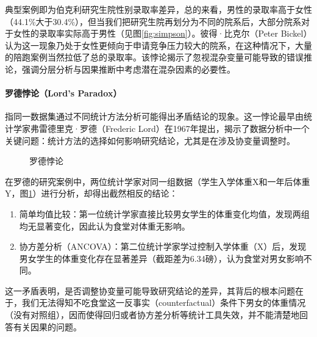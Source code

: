典型案例即为伯克利研究生院性别录取率差异，总的来看，男性的录取率高于女性（44.1\%大于30.4\%），但当我们把研究生院再划分为不同的院系后，大部分院系对于女性的录取率实际高于男性（见图\ref{fig:simpson}）。彼得·比克尔（Peter Bickel）认为这一现象乃处于女性更倾向于申请竞争压力较大的院系，在这种情况下，大量的陪跑案例当然拉低了总的录取率。该悖论揭示了忽视混杂变量可能导致的错误推论，强调分层分析与因果推断中考虑潜在混杂因素的必要性。

\paragraph*{罗德悖论（Lord’s Paradox）}指同一数据集通过不同统计方法分析可能得出矛盾结论的现象。这一悖论最早由统计学家弗雷德里克·罗德（Frederic Lord）在1967年提出，揭示了数据分析中一个关键问题：统计方法的选择如何影响研究结论，尤其是在涉及协变量调整时。

\begin{figure}[ht]
	\centering
	\caption{罗德悖论}
	\label{fig:lord}
\end{figure}

在罗德的研究案例中，两位统计学家对同一组数据（学生入学体重X和一年后体重Y，图\ref{fig:lord}）进行分析，却得出截然相反的结论：

\begin{enumerate}
	\item 简单均值比较：第一位统计学家直接比较男女学生的体重变化均值，发现两组均无显著变化，因此认为食堂对体重无影响。
	\item 协方差分析（ANCOVA）：第二位统计学家学过控制入学体重（X）后，发现男女学生的体重变化存在显著差异（截距差为6.34磅），认为食堂对男女影响不同。
\end{enumerate}

这一矛盾表明，是否调整协变量可能导致研究结论的差异，其背后的根本问题在于，我们无法得知不吃食堂这一反事实（counterfactual）条件下男女的体重情况（没有对照组），因而使得回归或者协方差分析等统计工具失效，并不能清楚地回答有关因果的问题。

